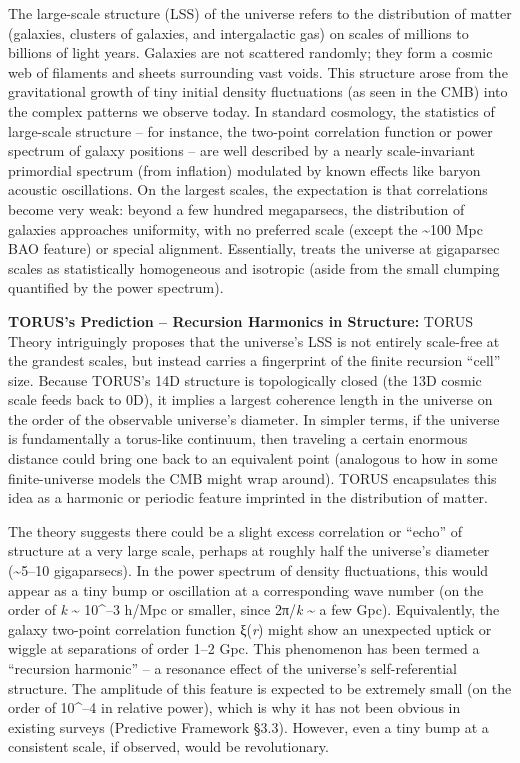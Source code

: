 \documentclass[
]{article}
\begin{document}
The large-scale structure (LSS) of the universe refers to the
distribution of matter (galaxies, clusters of galaxies, and
intergalactic gas) on scales of millions to billions of light years.
Galaxies are not scattered randomly; they form a cosmic web of filaments
and sheets surrounding vast voids. This structure arose from the
gravitational growth of tiny initial density fluctuations (as seen in
the CMB) into the complex patterns we observe today. In standard \LambdaCDM
cosmology, the statistics of large-scale structure -- for instance, the
two-point correlation function or power spectrum of galaxy positions --
are well described by a nearly scale-invariant primordial spectrum (from
inflation) modulated by known effects like baryon acoustic oscillations.
On the largest scales, the \LambdaCDM expectation is that correlations become
very weak: beyond a few hundred megaparsecs, the distribution of
galaxies approaches uniformity, with no preferred scale (except the
\textasciitilde100 Mpc BAO feature) or special alignment. Essentially,
\LambdaCDM treats the universe at gigaparsec scales as statistically
homogeneous and isotropic (aside from the small clumping quantified by
the power spectrum).

\textbf{TORUS's Prediction -- Recursion Harmonics in Structure:} TORUS
Theory intriguingly proposes that the universe's LSS is not entirely
scale-free at the grandest scales, but instead carries a fingerprint of
the finite recursion ``cell'' size. Because TORUS's 14D structure is
topologically closed (the 13D cosmic scale feeds back to 0D), it implies
a largest coherence length in the universe on the order of the
observable universe's diameter. In simpler terms, if the universe is
fundamentally a torus-like continuum, then traveling a certain enormous
distance could bring one back to an equivalent point (analogous to how
in some finite-universe models the CMB might wrap around). TORUS
encapsulates this idea as a harmonic or periodic feature imprinted in
the distribution of matter.

The theory suggests there could be a slight excess correlation or
``echo'' of structure at a very large scale, perhaps at roughly half the
universe's diameter (\textasciitilde5--10 gigaparsecs). In the power
spectrum of density fluctuations, this would appear as a tiny bump or
oscillation at a corresponding wave number (on the order of \emph{k}
\textasciitilde{} 10\^{}--3 h/Mpc or smaller, since 2π/\emph{k}
\textasciitilde{} a few Gpc). Equivalently, the galaxy two-point
correlation function ξ(\emph{r}) might show an unexpected uptick or
wiggle at separations of order 1--2 Gpc. This phenomenon has been termed
a ``recursion harmonic'' -- a resonance effect of the universe's
self-referential structure. The amplitude of this feature is expected to
be extremely small (on the order of 10\^{}--4 in relative power), which
is why it has not been obvious in existing surveys (Predictive Framework
§3.3). However, even a tiny bump at a consistent scale, if observed,
would be revolutionary.
\end{document}

